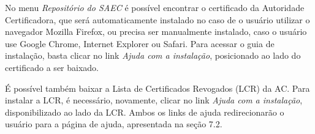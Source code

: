 No menu \textit{Repositório do SAEC} é possível encontrar o certificado da Autoridade Certificadora, que será automaticamente instalado no caso de o usuário utilizar o navegador Mozilla Firefox, ou precisa ser manualmente instalado, caso o usuário use Google Chrome, Internet Explorer ou Safari. Para acessar o guia de instalação, basta clicar no link \textit{Ajuda com a instalação}, posicionado ao lado do certificado a ser baixado.

É possível também baixar a Lista de Certificados Revogados (LCR) da AC. Para instalar a LCR, é necessário, novamente, clicar no link \textit{Ajuda com a instalação}, disponibilizado ao lado da LCR. Ambos os links de ajuda redirecionarão o usuário para a página de ajuda, apresentada na seção 7.2.

